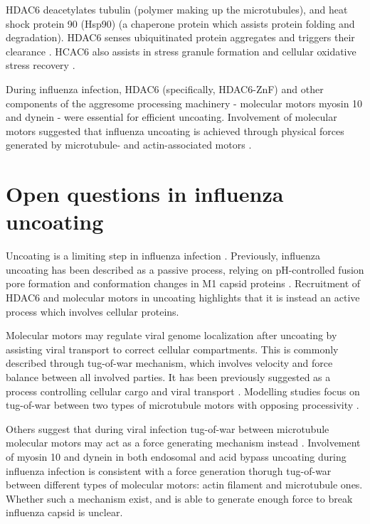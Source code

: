 HDAC6 deacetylates tubulin \cite{zhang2003hdac, zhang2008mice} (polymer making up the microtubules), and heat shock protein 90 (Hsp90) \cite{kovacs2005hdac6} (a chaperone protein which assists protein folding and degradation). HDAC6 senses ubiquitinated protein aggregates and triggers their clearance \cite{boyault2007hdac6}. HCAC6 also assists in stress granule formation and cellular oxidative stress recovery \cite{kwon2007deacetylase}.

During influenza infection, HDAC6 (specifically, HDAC6-ZnF) and other components of the aggresome processing machinery - molecular motors myosin 10 and dynein - were essential for efficient uncoating. Involvement of molecular motors suggested that influenza uncoating is achieved through physical forces generated by microtubule- and actin-associated motors \cite{banerjee2014influenza}.

\section{Open questions in influenza uncoating}

Uncoating is a limiting step in influenza infection \cite{banerjee2013high}. Previously, influenza uncoating has been described as a passive process, relying on pH-controlled fusion pore formation and conformation changes in M1 capsid proteins \cite{zhang2012dissection}. Recruitment of HDAC6 and molecular motors in uncoating \cite{banerjee2014influenza} highlights that it is instead an active process which involves cellular proteins.

Molecular motors may regulate viral genome localization after uncoating \cite{qin2019real} by assisting viral transport to correct cellular compartments. This is commonly described through tug-of-war mechanism, which involves velocity and force balance between all involved parties. It has been previously suggested as a process controlling cellular cargo and viral transport \cite{gazzola2009stochastic}. Modelling studies focus on tug-of-war between two types of microtubule motors with opposing processivity \cite{muller2008tug, gazzola2009stochastic}.

Others suggest that during viral infection tug-of-war between microtubule molecular motors may act as a force generating mechanism instead \cite{strunze2011kinesin,lukic2014hiv}. Involvement of myosin 10 and dynein in both endosomal and acid bypass uncoating during influenza infection is consistent with a force generation thorugh tug-of-war between different types of molecular motors: actin filament and microtubule ones. Whether such a mechanism exist, and is able to generate enough force to break influenza capsid is unclear.

